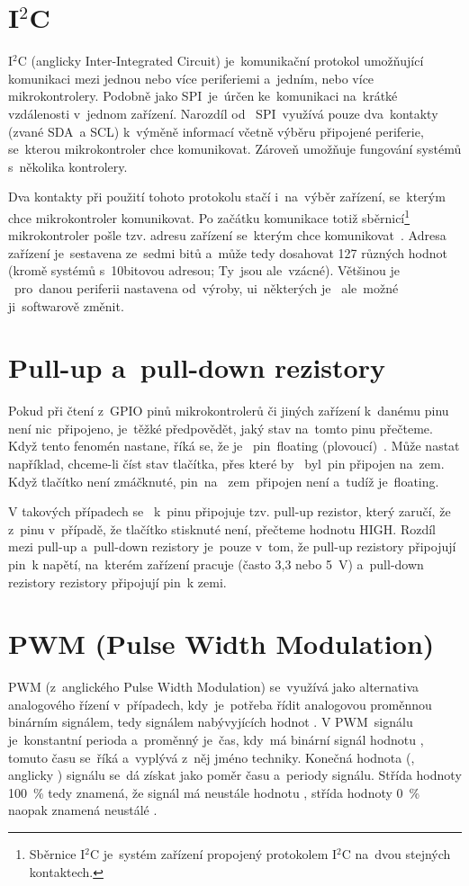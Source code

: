 \section{I$^{2}$C}
I$^{2}$C (anglicky Inter-Integrated Circuit) je~komunikační protokol umožňující komunikaci mezi jednou nebo více periferiemi  a~jedním, nebo více mikrokontrolery.
Podobně jako  SPI~je~úrčen ke~komunikaci na~krátké vzdálenosti  v~jednom zařízení.
Narozdíl od ~SPI~využívá pouze  dva~kontakty (zvané  SDA~a SCL)  k~výměně informací včetně výběru připojené periferie, se~kterou mikrokontroler chce komunikovat.
Zároveň umožňuje fungování systémů  s~několika kontrolery.~\cite{sparkfun-i2c}

Dva kontakty při použití tohoto protokolu stačí  i~na~výběr zařízení, se~kterým chce mikrokontroler komunikovat.
Po začátku komunikace totiž sběrnicí\footnote{Sběrnice I$^{2}$C je~systém zařízení propojený protokolem I$^{2}$C na~dvou stejných kontaktech.} mikrokontroler pošle tzv. adresu zařízení se~kterým chce komunikovat~\cite{sparkfun-i2c}.
Adresa zařízení je~sestavena ze~sedmi bitů  a~může tedy dosahovat 127 různých hodnot (kromě systémů  s~10bitovou adresou; Ty~jsou  ale~vzácné).
Většinou je ~pro~danou periferii nastavena od~výroby, ui~některých je ~ale~možné ji~softwarově změnit.

\section{Pull-up  a~pull-down rezistory}
Pokud při čtení  z~GPIO pinů mikrokontrolerů či jiných zařízení  k~danému pinu není  nic~připojeno, je~těžké předpovědět, jaký stav na~tomto pinu přečteme.
Když tento fenomén nastane, říká se, že je ~pin~floating (plovoucí)~\cite{sparkfun-pud}.
Může nastat například, chceme-li číst stav tlačítka, přes které by ~byl~pin připojen na~zem. Když tlačítko není zmáčknuté,  pin~na ~zem~připojen není  a~tudíž je~floating.

V takových případech se ~k~pinu připojuje tzv. pull-up rezistor, který zaručí, že  z~pinu  v~případě, že tlačítko stisknuté není, přečteme hodnotu HIGH.
Rozdíl mezi pull-up  a~pull-down rezistory je~pouze  v~tom, že pull-up rezistory připojují  pin~k napětí, na~kterém zařízení pracuje (často 3,3 nebo 5~V)  a~pull-down rezistory rezistory připojují  pin~k zemi.~\cite{sparkfun-pud}

\section{PWM (Pulse Width Modulation)}\label{sec:pwm}
PWM (z~anglického Pulse Width Modulation) se~využívá jako alternativa analogového řízení  v~případech,  kdy~je~potřeba řídit analogovou proměnnou binárním signálem, tedy signálem nabývyjících hodnot .
V  PWM~signálu je~konstantní perioda a~proměnný je~čas,  kdy~má binární signál hodnotu , tomuto času se~říká  a~vyplývá z~něj jméno techniky. Konečná hodnota (, anglicky ) signálu se~dá získat jako poměr času  a~periody signálu.
Střída hodnoty 100~\% tedy znamená, že signál má neustále hodnotu , střída hodnoty 0~\% naopak znamená neustálé .~\cite{pwm}\cite{wiki_pwm}

